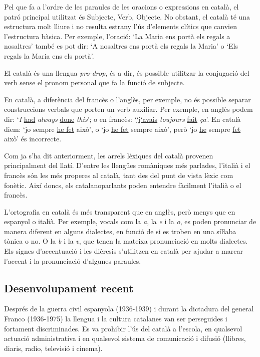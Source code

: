 \begin{multicols}{2}

Pel que fa a l’ordre de les paraules de les oracions o expressions en català, el patró principal utilitzat és Subjecte, Verb, Objecte. No obstant, el català té una estructura molt lliure i no resulta estrany l’ús d’elements clítics que canvien l’estructura bàsica. Per exemple, l’oració: ‘La Maria ens portà els regals a nosaltres’ també es pot dir: ‘A nosaltres ens portà els regals la Maria’ o ‘Els regals la Maria ens els portà’.

El català és una llengua \textit{pro-drop}, és a dir, és possible utilitzar la conjugació del verb sense el pronom personal que fa la funció de subjecte. 

En català, a diferència del francès o l’anglès, per exemple, no és possible separar construccions verbals que porten un verb auxiliar. Per exemple, en anglès podem dir: ‘\textit{I} \underline{had} \textit{always} \underline{done} \textit{this}’; o en francès: ‘\underline{‘j‘avais} \textit{toujours} \underline{fait}  \textit{ça}’. En català diem: ‘jo sempre \underline{he fet} això’, o ‘jo \underline{he fet} sempre això’, però ‘jo \underline{he} sempre \underline{fet} això’ és incorrecte.

Com ja s’ha dit anteriorment, les arrels lèxiques del català provenen principalment del llatí. D’entre les llengües romàniques més parlades, l’italià i el francès són les més properes al català, tant des del punt de vista lèxic com fonètic. Així doncs, els catalanoparlants poden entendre fàcilment l’italià o el francès. 

L’ortografia en català és més transparent que en anglès, però menys que en espanyol o italià. Per exemple, vocals com la \textit{a}, la \textit{e} i la \textit{o}, es poden pronunciar de manera diferent en alguns dialectes, en funció de si es troben en una síŀlaba tònica o no. O la \textit{b} i la \textit{v}, que tenen la mateixa pronunciació en molts dialectes. Els signes d’accentuació i les dièresis s’utilitzen en català per ajudar a marcar l’accent i la pronunciació d’algunes paraules.

\subsection{Desenvolupament recent}

Després de la guerra civil espanyola (1936-1939) i durant la dictadura del general Franco (1936-1975) la llengua i la cultura catalanes van ser perseguides i fortament discriminades. Es va prohibir l’ús del català a l’escola, en qualsevol actuació administrativa i en qualsevol sistema de comunicació i difusió (llibres, diaris, radio, televisió i cinema).


\end{multicols}
